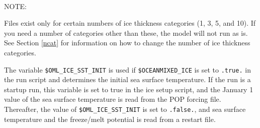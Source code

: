  \\

\begin{Ventry}{NOTE:}
\item[NOTE]
Files exist only for certain numbers of ice thickness categories 
(1, 3, 5, and 10).  If you need a number of categories other than
these, the model will not run as is.  See Section \ref{ncat} for
information on how to change the number of ice thickness categories.
\end{Ventry}

The variable {\tt \$OML\_ICE\_SST\_INIT} is used if {\tt \$OCEANMIXED\_ICE} is
set to {\tt .true.} in the run script and determines the initial sea surface
temperature.  If the run is a startup run, this variable
is set to true in the ice setup script, and the January 1 value of the sea
surface temperature is read from the POP forcing file.  Thereafter, the
value of {\tt \$OML\_ICE\_SST\_INIT} is set to {\tt .false.}, and sea surface temperature
and the freeze/melt potential is read from a restart file.

